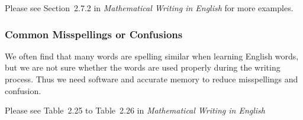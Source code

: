 Please see Section~2.7.2 in \emph{Mathematical Writing in English}\cite{2013数学之英文写作} for more examples.

\subsubsection{Common Misspellings or Confusions}
We often find that many words are spelling similar when learning English words, but we are not sure whether the words are used properly during the writing process. Thus we need software and accurate memory to reduce misspellings and confusion.

Please see Table~2.25 to Table~2.26 in \emph{Mathematical Writing in English}\cite{2013数学之英文写作}




\nocite{2013数学之英文写作,Nicholas1998Handbook}

